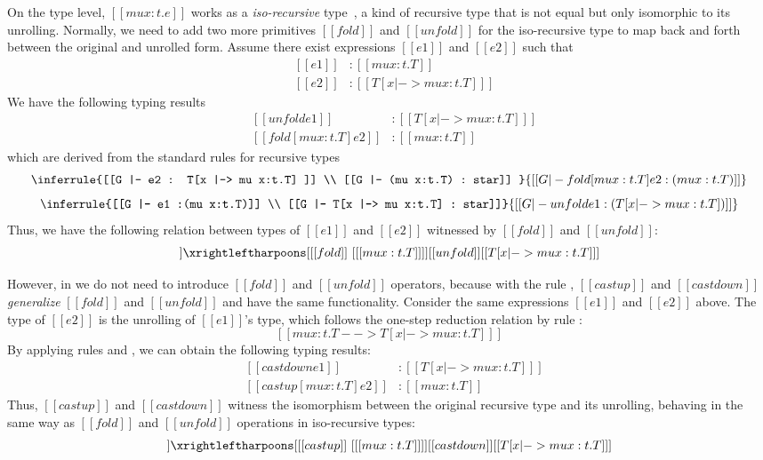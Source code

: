 On the type level, $[[mu x:t.e]]$ works as a \emph{iso-recursive}
type~\cite{eqi:iso}, a kind of recursive type that is not equal but only isomorphic
to its unrolling. Normally, we need to add two more primitives
$[[fold]]$ and $[[unfold]]$ for the iso-recursive type to map back
and forth between the original and unrolled form. Assume there exist
expressions $[[e1]]$ and $[[e2]]$ such that
\[\begin{array}{lll}
  &[[e1]] &: [[mu x:t.T]]\\
  &[[e2]] &: [[T [x |-> mu x:t.T] ]]
\end{array}\]
We have the following typing results
\[\begin{array}{lll}
  &[[unfold e1]] &: [[T [x |-> mu x:t.T] ]]\\
  &[[fold [mu x:t.T] e2]] &: [[mu x:t.T]]
\end{array}\]
which are derived from the standard rules for recursive types~\cite{tapl}
\[ \inferrule{[[G |- e2 : T[x |-> mu x:t.T] ]] \\ [[G |- (mu x:t.T) : star]] }
   {[[G |- fold [mu x:t.T] e2 : (mu x:t.T) ]]} \]
\[ \inferrule{[[G |- e1 :(mu x:t.T)]] \\ [[G |- T[x |-> mu x:t.T] : star]]}
   {[[G |- unfold e1 : (T[x |-> mu x:t.T]) ]]} \]
Thus, we have the following relation between types of $[[e1]]$ and $[[e2]]$
witnessed by $[[fold]]$ and $[[unfold]]$:
\begin{align*}
  [[mu x:t.T]] \xrightleftharpoons[{[[fold]]~[ [[mu x:t.T]] ]}]
  {[[unfold]]} [[T[x |-> mu x:t.T] ]]
\end{align*}

However, in \name we do not need to introduce $[[fold]]$ and
$[[unfold]]$ operators, because with the rule ,
$[[castup]]$ and $[[castdown]]$ \emph{generalize} $[[fold]]$ and
$[[unfold]]$ and have the same functionality.
Consider the same expressions $[[e1]]$ and $[[e2]]$ above. The type of
$[[e2]]$ is the unrolling of $[[e1]]$'s type, which follows the
one-step reduction relation by rule :
\[ [[mu x:t.T --> T [x |-> mu x:t.T] ]] \]
By applying rules  and , we
can obtain the following typing results:
\[\begin{array}{lll}
	&[[castdown e1]] &: [[T [x |-> mu x:t.T] ]]\\
	&[[castup [mu x:t.T] e2]] &: [[mu x:t.T]]
\end{array}\]
Thus, $[[castup]]$ and $[[castdown]]$ witness the isomorphism between
the original recursive type and its unrolling, behaving in the
same way
as $[[fold]]$ and $[[unfold]]$ operations in iso-recursive types:
\begin{align*}
  [[mu x:t.T]] \xrightleftharpoons[{[[castup]]~[ [[mu x:t.T]]
  ]}]{[[castdown]]} [[T[x |-> mu x:t.T] ]]
\end{align*}


